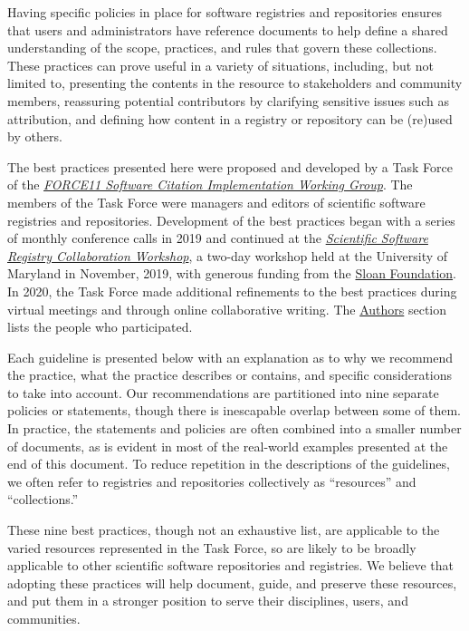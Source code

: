 \documentclass[11pt]{article}
\begin{document}
Having specific policies in place for software registries and repositories ensures that users and administrators have reference documents to help define a shared understanding of the scope, practices, and rules that govern these collections. These practices can prove useful in a variety of situations, including, but not limited to, presenting the contents in the resource to stakeholders and community members, reassuring potential contributors by clarifying sensitive issues such as attribution, and defining how content in a registry or repository can be (re)used by others.

The best practices presented here were proposed and developed by a Task Force of the \href{https://github.com/force11/force11-sciwg}{\emph{FORCE11 Software Citation Implementation Working Group}}.  The members of the Task Force were managers and editors of scientific software registries and repositories.  Development of the best practices began with a series of monthly conference calls in 2019 and continued at the \href{https://asclnet.github.io/SWRegistryWorkshop/}{\emph{Scientific Software Registry Collaboration Workshop}}, a two-day workshop held at the University of Maryland in November, 2019, with generous funding from the \href{https://sloan.org}{Sloan Foundation}. In 2020, the Task Force made additional refinements to the best practices during virtual meetings and through online collaborative writing.  The \hyperref[authors]{Authors} section lists the people who participated.

Each guideline is presented below with an explanation as to why we recommend the practice, what the practice describes or contains, and specific considerations to take into account.  Our recommendations are partitioned into nine separate policies or statements, though there is inescapable overlap between some of them. In practice, the statements and policies are often combined into a smaller number of documents, as is evident in most of the real-world examples presented at the end of this document. To reduce repetition in the descriptions of the guidelines, we often refer to registries and repositories collectively as ``resources'' and ``collections.''  

These nine best practices, though not an exhaustive list, are applicable to the varied resources represented in the Task Force, so are likely to be broadly applicable to other scientific software repositories and registries. We believe that adopting these practices will help document, guide, and preserve these resources, and put them in a stronger position to serve their disciplines, users, and communities.
\end{document}
